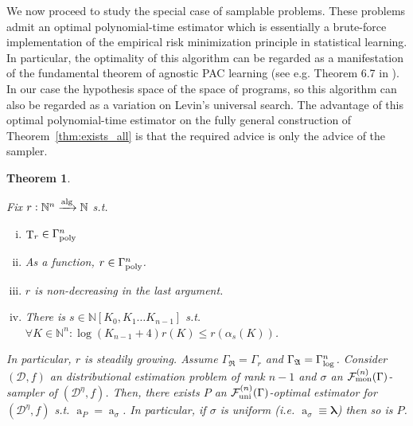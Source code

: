 \documentclass{article}
\numberwithin{equation}{section}
\theoremstyle{definition}
\theoremstyle{plain}
\newtheorem{theorem}{Theorem}[section]
\DeclareMathOperator{\T}{T}
\DeclareMathOperator{\A}{a}
\newcommand{\Nats}{\mathbb{N}}
\newcommand{\NatPoly}{\Nats[K_0, K_1 \ldots K_{n-1}]}
\newcommand{\Estr}{\bm{\lambda}}
\newcommand{\Dist}{\mathcal{D}}
\newcommand{\GrowR}{\Gamma_{\mathfrak{R}}}
\newcommand{\GrowA}{\Gamma_{\mathfrak{A}}}
\newcommand{\Fall}{\mathcal{F}}
\newcommand{\GammaPoly}{\Gamma_{\textnormal{poly}}}
\newcommand{\FallU}{{\Fall_{\textnormal{uni}}^{(n)}}}
\newcommand{\FallM}{\Fall_{\textnormal{mon}}^{(n)}}
\newcommand{\Alg}{\xrightarrow{\textnormal{alg}}}
\begin{document}
We now proceed to study the special case of samplable problems. These problems admit an optimal polynomial-time estimator which is essentially a brute-force implementation of the empirical risk minimization principle in statistical learning. In particular, the optimality of this algorithm can be regarded as a manifestation of the fundamental theorem of agnostic PAC learning (see e.g. Theorem 6.7 in \cite{Shalev-Shwartz_2014}). In our case the hypothesis space of the space of programs, so this algorithm can also be regarded as a variation on Levin's universal search. The advantage of this optimal polynomial-time estimator on the fully general construction of Theorem~\ref{thm:exists_all} is that the required advice is only the advice of the sampler.

\begin{samepage}
\begin{theorem}
\label{thm:exists_smp}

Fix ${r: \Nats^n \Alg \Nats}$ s.t.

\begin{enumerate}[(i)]

\item ${\T_r \in \GammaPoly^n}$

\item As a function, ${r \in \GammaPoly^n}$.

\item ${r}$ is non-decreasing in the last argument.

\item There is ${s \in \NatPoly}$ s.t. ${\forall K \in \Nats^n: \log(K_{n-1}+4)r(K) \leq r(\alpha_s(K))}$.

\end{enumerate}

In particular, ${r}$ is steadily growing. Assume ${\GrowR=\Gamma_r}$ and ${\GrowA=\Gamma_\textnormal{log}^n}$. Consider ${(\Dist,f)}$ an distributional estimation problem of rank ${n-1}$ and ${\sigma}$ an ${\FallM(\Gamma)}$-sampler of ${(\Dist^\eta,f)}$. Then, there exists ${P}$ an ${\FallU(\Gamma)}$-optimal estimator for ${(\Dist^\eta,f)}$ s.t. ${\A_P=\A_\sigma}$. In particular, if ${\sigma}$ is uniform (i.e. ${\A_\sigma \equiv \Estr}$) then so is ${P}$.


\end{theorem}
\end{samepage}
\end{document}
